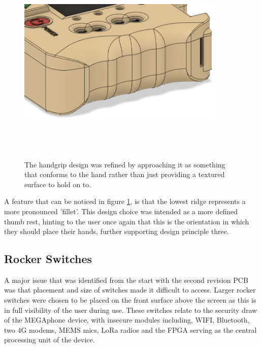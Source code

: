 \begin{figure} [h]
    \centering
    \includegraphics[width=10cm,height=10cm,keepaspectratio]{Figures/handgrip_final.png}
    \caption{The handgrip design was refined by approaching it as something that conforms to the hand rather than just providing a textured surface to hold on to.}
    \label{fig:new_grips}
\end{figure}

A feature that can be noticed in figure \ref{fig:new_grips}, is that the lowest ridge represents a more pronounced 'fillet'.
This design choice was intended as a more defined thumb rest, hinting to the user once again that this is the orientation in which they should place their hands, further supporting design principle three.

\subsection{Rocker Switches}

A major issue that was identified from the start with the second revision PCB was that placement and size of switches made it difficult to access.
Larger rocker switches were chosen to be placed on the front surface above the screen as this is in full visibility of the user during use.
These switches relate to the security draw of the MEGAphone device, with insecure modules including, WIFI, Bluetooth, two 4G modems, MEMS mics, LoRa radios and the FPGA serving as the central processing unit of the device.

